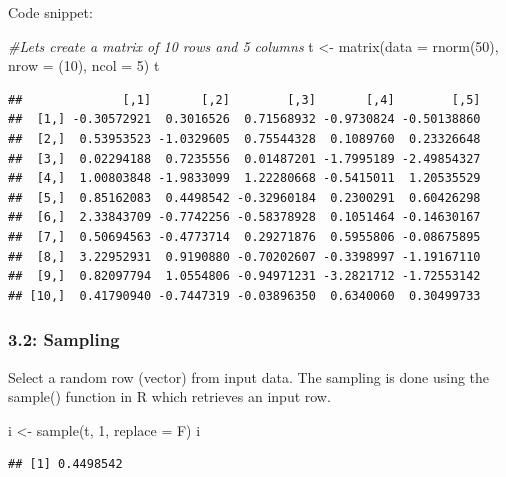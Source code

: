 \documentclass[
]{article}
\newenvironment{Shaded}{\begin{snugshade}}{\end{snugshade}}
\newcommand{\AttributeTok}[1]{\textcolor[rgb]{0.77,0.63,0.00}{#1}}
\newcommand{\CommentTok}[1]{\textcolor[rgb]{0.56,0.35,0.01}{\textit{#1}}}
\newcommand{\DecValTok}[1]{\textcolor[rgb]{0.00,0.00,0.81}{#1}}
\newcommand{\FunctionTok}[1]{\textcolor[rgb]{0.00,0.00,0.00}{#1}}
\newcommand{\NormalTok}[1]{#1}
\newcommand{\OtherTok}[1]{\textcolor[rgb]{0.56,0.35,0.01}{#1}}
\begin{document}
Code snippet:

\begin{Shaded}
\begin{Highlighting}[]
\CommentTok{\#Let\textquotesingle{}s create a matrix of 10 rows and 5 columns}
\NormalTok{t }\OtherTok{\textless{}{-}} \FunctionTok{matrix}\NormalTok{(}\AttributeTok{data =} \FunctionTok{rnorm}\NormalTok{(}\DecValTok{50}\NormalTok{),  }\AttributeTok{nrow =}\NormalTok{ (}\DecValTok{10}\NormalTok{), }\AttributeTok{ncol =} \DecValTok{5}\NormalTok{)}
\NormalTok{t}
\end{Highlighting}
\end{Shaded}

\begin{verbatim}
##              [,1]       [,2]        [,3]       [,4]        [,5]
##  [1,] -0.30572921  0.3016526  0.71568932 -0.9730824 -0.50138860
##  [2,]  0.53953523 -1.0329605  0.75544328  0.1089760  0.23326648
##  [3,]  0.02294188  0.7235556  0.01487201 -1.7995189 -2.49854327
##  [4,]  1.00803848 -1.9833099  1.22280668 -0.5415011  1.20535529
##  [5,]  0.85162083  0.4498542 -0.32960184  0.2300291  0.60426298
##  [6,]  2.33843709 -0.7742256 -0.58378928  0.1051464 -0.14630167
##  [7,]  0.50694563 -0.4773714  0.29271876  0.5955806 -0.08675895
##  [8,]  3.22952931  0.9190880 -0.70202607 -0.3398997 -1.19167110
##  [9,]  0.82097794  1.0554806 -0.94971231 -3.2821712 -1.72553142
## [10,]  0.41790940 -0.7447319 -0.03896350  0.6340060  0.30499733
\end{verbatim}

\hypertarget{sampling}{%
\subsubsection{3.2: Sampling}\label{sampling}}

Select a random row (vector) from input data. The sampling is done using
the sample() function in R which retrieves an input row.

\begin{Shaded}
\begin{Highlighting}[]
\NormalTok{i }\OtherTok{\textless{}{-}} \FunctionTok{sample}\NormalTok{(t, }\DecValTok{1}\NormalTok{, }\AttributeTok{replace =}\NormalTok{ F)}
\NormalTok{i}
\end{Highlighting}
\end{Shaded}

\begin{verbatim}
## [1] 0.4498542
\end{verbatim}
\end{document}
